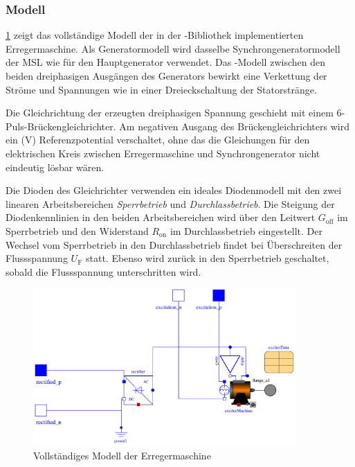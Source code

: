 \subsubsection{Modell}\label{modell-erregermaschine}

\cref{fig:Erregermaschine} zeigt das vollständige Modell der in der -Bibliothek implementierten Erregermaschine. Als Generatormodell wird dasselbe Synchrongeneratormodell der MSL wie für den Hauptgenerator verwendet. Das -Modell zwischen den beiden dreiphasigen Ausgängen des Generators bewirkt eine Verkettung der Ströme und Spannungen wie in einer Dreieckschaltung der Statorstränge.

Die Gleichrichtung der erzeugten dreiphasigen Spannung geschieht mit einem 6-Puls-Brückengleichrichter. Am negativen Ausgang des Brückengleichrichters wird ein (\unit[0]{V}) Referenzpotential verschaltet, ohne das die Gleichungen für den elektrischen Kreis zwischen Erregermaschine und Synchrongenerator nicht eindeutig lösbar wären.

Die Dioden des Gleichrichter verwenden ein ideales Diodenmodell mit den zwei linearen Arbeitsbereichen \emph{Sperrbetrieb} und \emph{Durchlassbetrieb}. Die Steigung der Diodenkennlinien in den beiden Arbeitsbereichen wird über den Leitwert \(G_{\mathrm{off}}\) im Sperrbetrieb und den Widerstand \(R_{\mathrm{on}}\) im Durchlassbetrieb eingestellt. Der Wechsel vom Sperrbetrieb in den Durchlassbetrieb findet bei Überschreiten der Flussspannung \(U_{\mathrm{F}}\) statt. Ebenso wird zurück in den Sperrbetrieb geschaltet, sobald die Flussspannung unterschritten wird.

\begin{figure}
    \centering
    \includegraphics[height=6cm]{Bilder/SM_Erreger.pdf}
    \caption{Vollständiges Modell der Erregermaschine }
    \label{fig:Erregermaschine}
\end{figure}

